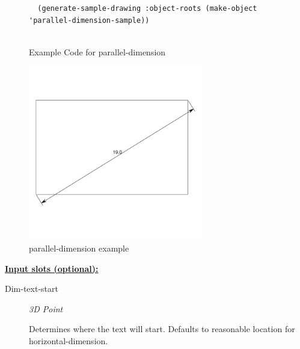 \documentclass [11pt]{book}
\begin{document}
\begin{itemize}
\begin{figure}
\begin{lrbox}{\boxedverb}
\begin{minipage}{\linewidth}
{\begin{verbatim}
  (generate-sample-drawing :object-roots (make-object 'parallel-dimension-sample))


\end{verbatim}}
\end{minipage}
\end{lrbox}
\fbox{\usebox{\boxedverb}}

\caption{Example Code for parallel-dimension}

\label{fig:example-code-parallel-dimension}

\end{figure}

\begin{figure}
\begin{center}
\includegraphics[width=3in,height=3in]{../images/example-parallel-dimension.pdf}
\end{center}

\caption{parallel-dimension example}

\label{fig:parallel-dimension}

\end{figure}





\textbf{
\underline{Input slots (optional):}}

\begin{description}

\item [Dim-text-start]
\emph{3D Point}

 Determines where the text will start. Defaults to reasonable location for
horizontal-dimension.




\end{description}







\end{itemize}
\end{document}
